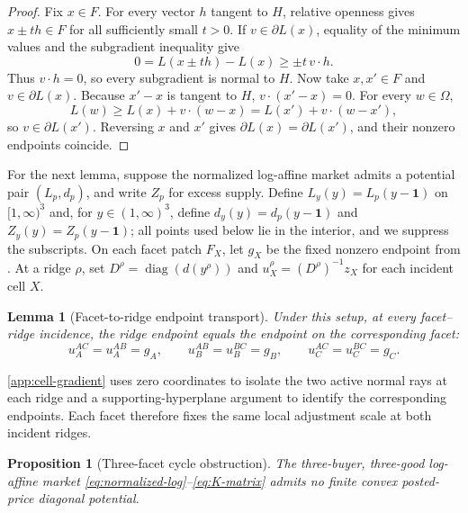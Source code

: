 \documentclass[11pt,a4paper,fleqn]{article}
\theoremstyle{plain}
\newtheorem{proposition}{Proposition}
\newtheorem{lemma}{Lemma}[section]
\theoremstyle{definition}
\newcommand{\diag}{\operatorname{diag}}
\newcommand{\one}{\mathbf{1}}
\begin{document}
\begin{proof}
Fix $x\in F$. For every vector $h$ tangent to $H$, relative openness gives $x\pm th\in F$ for all sufficiently small $t>0$. If $v\in\partial L(x)$, equality of the minimum values and the subgradient inequality give
\[
0=L(x\pm th)-L(x)\ge \pm t\,v\cdot h.
\]
Thus $v\cdot h=0$, so every subgradient is normal to $H$. Now take $x,x'\in F$ and $v\in\partial L(x)$. Because $x'-x$ is tangent to $H$, $v\cdot(x'-x)=0$. For every $w\in\Omega$,
\[
L(w)\ge L(x)+v\cdot(w-x)
=L(x')+v\cdot(w-x'),
\]
so $v\in\partial L(x')$. Reversing $x$ and $x'$ gives $\partial L(x)=\partial L(x')$, and their nonzero endpoints coincide.
\end{proof}

For the next lemma, suppose the normalized log-affine market admits a potential pair $(L_p,d_p)$, and write $Z_p$ for excess supply. Define $L_y(y)=L_p(y-\one)$ on $[1,\infty)^3$ and, for $y\in(1,\infty)^3$, define $d_y(y)=d_p(y-\one)$ and $Z_y(y)=Z_p(y-\one)$; all points used below lie in the interior, and we suppress the subscripts. On each facet patch $F_X$, let $g_X$ be the fixed nonzero endpoint from . At a ridge $\rho$, set $D^\rho=\diag(d(y^\rho))$ and $u_X^\rho=(D^\rho)^{-1}z_X$ for each incident cell $X$.

\begin{lemma}[Facet-to-ridge endpoint transport]\label{lem:ridge-transport}
Under this setup, at every facet--ridge incidence, the ridge endpoint equals the endpoint on the corresponding facet:
\[
u_A^{AC}=u_A^{AB}=g_A,
\qquad
u_B^{AB}=u_B^{BC}=g_B,
\qquad
u_C^{AC}=u_C^{BC}=g_C.
\]
\end{lemma}

\ref{app:cell-gradient} uses zero coordinates to isolate the two active normal rays at each ridge and a supporting-hyperplane argument to identify the corresponding endpoints. Each facet therefore fixes the same local adjustment scale at both incident ridges.

\begin{proposition}[Three-facet cycle obstruction]\label{prop:holonomy}
The three-buyer, three-good log-affine market \eqref{eq:normalized-log}--\eqref{eq:K-matrix} admits no finite convex posted-price diagonal potential.
\end{proposition}
\end{document}
